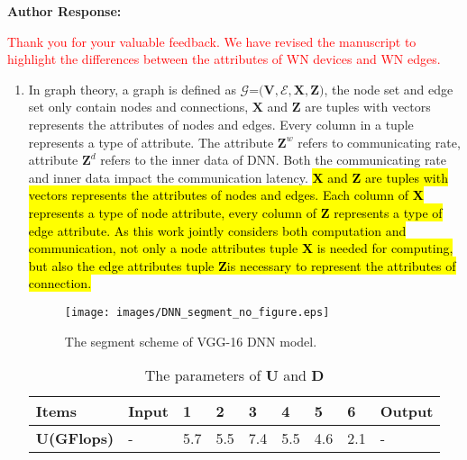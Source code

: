 \documentclass{ar2rc}
\newcommand{\highlight}[1]{\sethlcolor{yellow!50}\hl{#1}}
\begin{document}
\textbf{Author Response:} 

\textcolor{red}{Thank you for your valuable feedback. We have revised the manuscript to highlight the differences between the attributes of WN devices and WN edges.}


\begin{enumerate}
	\item  In graph theory, a graph is defined as $\mathcal{G}$=$\big(\mathbf{V}, \mathcal{E}, \mathbf{X}, \mathbf{Z}\big)$, the node set and edge set only contain nodes and connections, $\mathbf{X}$ and $\mathbf{Z}$ are tuples with vectors represents the attributes of nodes and edges. Every column in a tuple represents a type of attribute. The attribute $\mathbf{Z}^w$ refers to communicating rate, attribute $\mathbf{Z}^d$ refers to the inner data of DNN. Both the communicating rate and inner data impact the communication latency. \highlight{$\mathbf{X}$ and $\mathbf{Z}$ are tuples with vectors represents the attributes of nodes and edges. Each column of $\mathbf{X}$ represents a type of node attribute, every column of $\mathbf{Z}$ represents a type of edge attribute.  As this work jointly considers both computation and communication, not only a node attributes tuple $\mathbf{X}$ is needed for computing, but also the edge attributes tuple $\mathbf{Z}$is necessary to represent the attributes of connection.}
	
   \setcounter{figure}{1} %
   \begin{figure}[thbp] %
      \centering
      \texttt{[image: images/DNN\_segment\_no\_figure.eps]}
      \caption{The segment scheme of VGG-16 DNN model.}\label{fig:segment scheme}
   \end{figure}

   \renewcommand{\thetable}{II} %
   \begin{table}[h]  %
      \centering
      \caption{The parameters of $\mathbf{U}$ and $\mathbf{D}$} %
      \begin{tabular}{m{1.5cm}<{\centering} | m{0.8cm}<{\centering}|m{0.5cm}<{\centering}|m{0.5cm}<{\centering}|m{0.5cm}<{\centering}|m{0.5cm}<{\centering}|m{0.5cm}<{\centering}|m{0.5cm}<{\centering}|m{1.3cm}<{\centering}}  %
         \toprule
         Items                       & Input & 1           & 2 & 3 & 4 & 5 & 6 & Output  \\
         \hline
         \bfseries  $\mathbf{U}$(GFlops) & - & 5.7 & 5.5 & 7.4 & 5.5 & 4.6 & 2.1 & -   \\


\end{tabular}
\end{table}
\end{enumerate}
\end{document}
